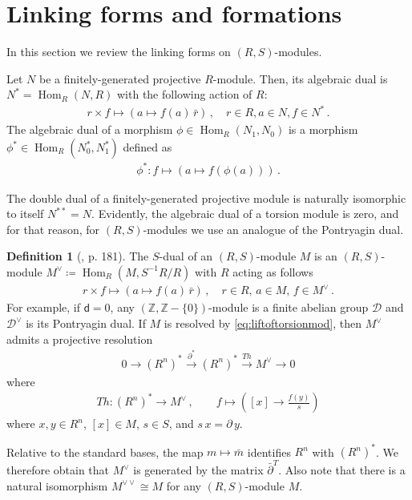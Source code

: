 \documentclass[sn-mathphys-num]{sn-jnl}
\theoremstyle{definition}
\newtheorem{definition}[lemma]{Definition}
\numberwithin{equation}{section}
\theoremstyle{definition}
\def\CD {{\mathcal D}}
\def\CD {{\mathcal D}}
\def\pd{\partial}
\def\IZ{{\mathbb{Z}}}
\def\Hom{\operatorname{Hom}}
\newcommand{\dd}{{\mathsf{d}}} %
\begin{document}
\section{Linking forms and formations}\label{sec:linking forms}
In this section we review the linking forms on $(R,S)$-modules. 

Let $N$ be a finitely-generated projective $R$-module. Then, its algebraic dual is $N^*=\Hom_{R}(N,R)$ with the following action of $R$:
\begin{align}
   r\times f\mapsto (a\mapsto f(a)\,\bar{r})\,,\quad r\in R,a\in N,f\in N^{*}\,.
\end{align}
The algebraic dual of a morphism $\phi\in \Hom_R(N_1,N_0)$ is a morphism $\phi^*\in \Hom_R(N_0^*,N_1^*)$ defined as 
\begin{align}
    \phi^*:f\mapsto (a\mapsto f(\phi(a)))\,.
\end{align}

The double dual of a finitely-generated projective module is naturally isomorphic to itself $N^{**}=N$. Evidently, the algebraic dual of a torsion module is zero, and for that reason, for $(R,S)$-modules we use an analogue of the Pontryagin dual.

\begin{definition}[\cite{Ranicki1981ExactSI}, p. 181]
    The $S$-dual of an $(R,S)$-module $M$ is an $(R,S)$-module  $M^{\vee}\coloneqq\Hom_R(M,S^{-1}R/R)$
with $R$ acting as follows
\begin{align}
   r\times f\mapsto (a\mapsto f(a)\,\bar{r})\,,\quad r\in R,\,a\in M,\,f\in M^{\vee}\,.
\end{align}
For example, if $\dd=0$, any $(\IZ,\IZ-\{0\})$-module is a finite abelian group $\CD$ and $\CD^{\vee}$ is its Pontryagin dual. If $M$ is resolved by \eqref{eq:liftoftorsionmod}, then $M^{\vee}$ admits a projective resolution 
    \begin{align}
        0\rightarrow (R^n)^{*} \xrightarrow{\pd^*}(R^n)^*\xrightarrow{Th}M^{\vee}\rightarrow 0
    \end{align}
where
\begin{align}
    Th:(R^n)^*\to M^{\vee}\,,\quad\quad
    f\mapsto \left([x]\to \frac{f(y)}{s}\right)
\end{align}
where $x,y\in R^n$, $[x]\in M$, $s \in S$, and $s\,x=\pd\, y$.
\end{definition}

Relative to the standard bases, the map $m\mapsto\bar m$ identifies $R^n$ with $(R^n)^*$. We therefore obtain that $M^\vee$ is generated by the matrix $\bar{\pd}^T$. Also note that there is a natural isomorphism $M^{\vee\vee}\cong M$ for any $(R,S)$-module $M$.
\end{document}
